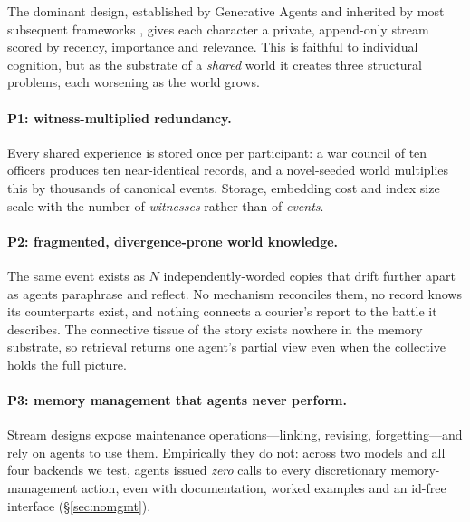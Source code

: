 \documentclass{article}
\begin{document}
The dominant design, established by Generative Agents
\citep{park2023generative} and inherited by most subsequent frameworks
\citep{ran2025bookworld,zhang2024memsurvey}, gives each character a private,
append-only stream scored by recency, importance and relevance. This is faithful
to individual cognition, but as the substrate of a \emph{shared} world it
creates three structural problems, each worsening as the world grows.

\paragraph{P1: witness-multiplied redundancy.} Every shared experience is stored
once per participant: a war council of ten officers produces ten near-identical
records, and a novel-seeded world multiplies this by thousands of canonical
events. Storage, embedding cost and index size scale with the number of
\emph{witnesses} rather than of \emph{events}.

\paragraph{P2: fragmented, divergence-prone world knowledge.} The same event
exists as $N$ independently-worded copies that drift further apart as agents
paraphrase and reflect. No mechanism reconciles them, no record knows its
counterparts exist, and nothing connects a courier's report to the battle it
describes. The connective tissue of the story exists nowhere in the memory
substrate, so retrieval returns one agent's partial view even when the
collective holds the full picture.

\paragraph{P3: memory management that agents never perform.} Stream designs
expose maintenance operations---linking, revising, forgetting---and rely on
agents to use them. Empirically they do not: across two models and all four
backends we test, agents issued \emph{zero} calls to every discretionary
memory-management action, even with documentation, worked examples and an
id-free interface (\S\ref{sec:nomgmt}).
\end{document}
